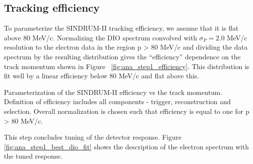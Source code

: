 \subsection{Tracking efficiency}

To parameterize the SINDRUM-II tracking efficiency, we assume that it is flat
above 80 MeV/c. Normalizing the DIO spectrum convolved with $\sigma_P = 2.0$ MeV/c
resolution to the electron data in the region p > 80 MeV/c and dividing the data spectrum
by the resulting distribution gives the ``efficiency'' dependence on the track momentum
shown in Figure ~\ref{fig:ana_step1_efficiency}. This distribution is fit well by a 
linear efficiency below 80 MeV/c and flat above this.

%
 {
  \label{fig:ana_step1_efficiency}
  Parameterization of the SINDRUM-II efficiency vs the track momentum.
  Definition of efficiency includes all components - trigger, reconstruction and selection.
  Overall normalization is chosen such that efficiency is equal to one for p > 80 MeV/c.
}
\vspace{0.2in}

This step concludes tuning of the detector response. Figure \ref{fig:ana_step1_best_dio_fit}
shows the description of the electron spectrum with the tuned response.

